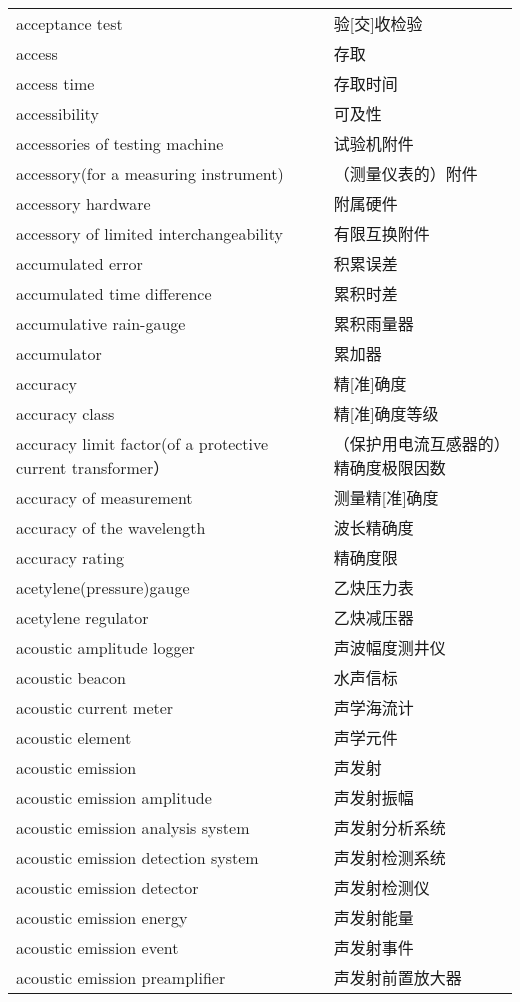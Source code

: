 \documentclass[
]{article}
\begin{document}
\begin{longtable}[]{@{}ll@{}}
acceptance test & 验{[}交{]}收检验 \\
access & 存取 \\
access time & 存取时间 \\
accessibility & 可及性 \\
accessories of testing machine & 试验机附件 \\
accessory(for a measuring instrument) & （测量仪表的）附件 \\
accessory hardware & 附属硬件 \\
accessory of limited interchangeability & 有限互换附件 \\
accumulated error & 积累误差 \\
accumulated time difference & 累积时差 \\
accumulative rain-gauge & 累积雨量器 \\
accumulator & 累加器 \\
accuracy & 精{[}准{]}确度 \\
accuracy class & 精{[}准{]}确度等级 \\
accuracy limit factor(of a protective current transformer） &
（保护用电流互感器的）精确度极限因数 \\
accuracy of measurement & 测量精{[}准{]}确度 \\
accuracy of the wavelength & 波长精确度 \\
accuracy rating & 精确度限 \\
acetylene(pressure)gauge & 乙炔压力表 \\
acetylene regulator & 乙炔减压器 \\
acoustic amplitude logger & 声波幅度测井仪 \\
acoustic beacon & 水声信标 \\
acoustic current meter & 声学海流计 \\
acoustic element & 声学元件 \\
acoustic emission & 声发射 \\
acoustic emission amplitude & 声发射振幅 \\
acoustic emission analysis system & 声发射分析系统 \\
acoustic emission detection system & 声发射检测系统 \\
acoustic emission detector & 声发射检测仪 \\
acoustic emission energy & 声发射能量 \\
acoustic emission event & 声发射事件 \\
acoustic emission preamplifier & 声发射前置放大器 \\

\end{longtable}
\end{document}
